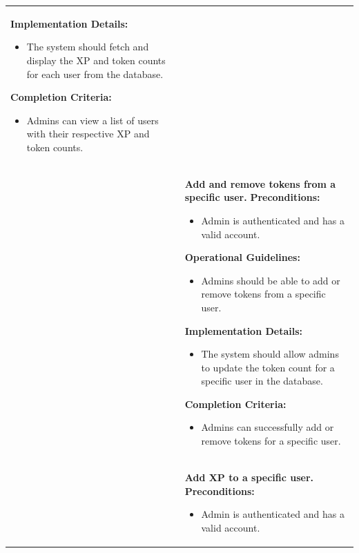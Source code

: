 \begin{longtable}{ | p{} | p{} | }
\begin{itemize}
    \end{itemize}
    \textbf{Implementation Details:} \newline
    \begin{itemize}
        \item The system should fetch and display the XP and token counts for each user from the database.
    \end{itemize}
    \textbf{Completion Criteria:} \newline
    \begin{itemize}
        \item Admins can view a list of users with their respective XP and token counts.
    \end{itemize} \\
    \cline{2-2}
    & \textbf{Add and remove tokens from a specific user.} \newline
    \textbf{Preconditions:} \newline
    \begin{itemize}
        \item Admin is authenticated and has a valid account.
    \end{itemize}
    \textbf{Operational Guidelines:} \newline
    \begin{itemize}
        \item Admins should be able to add or remove tokens from a specific user.
    \end{itemize}
    \textbf{Implementation Details:} \newline
    \begin{itemize}
        \item The system should allow admins to update the token count for a specific user in the database.
    \end{itemize}
    \textbf{Completion Criteria:} \newline
    \begin{itemize}
        \item Admins can successfully add or remove tokens for a specific user.
    \end{itemize} \\
    \cline{2-2}
    & \textbf{Add XP to a specific user.} \newline
    \textbf{Preconditions:} \newline
    \begin{itemize}
        \item Admin is authenticated and has a valid account.
    \end{itemize}

\end{longtable}
